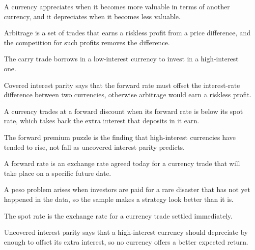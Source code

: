 \begin{keyterms}
\footnotesize
\begin{description}[leftmargin=0pt, itemsep=0pt, parsep=0pt, topsep=0pt, font=\normalfont\bfseries\color{FEMaroon}]
  \item[Appreciation.] A currency appreciates when it becomes more valuable in terms of another currency, and it depreciates when it becomes less valuable.
  \item[Arbitrage.] Arbitrage is a set of trades that earns a riskless profit from a price difference, and the competition for such profits removes the difference.
  \item[Carry trade.] The carry trade borrows in a low-interest currency to invest in a high-interest one.
  \item[Covered interest parity.] Covered interest parity says that the forward rate must offset the interest-rate difference between two currencies, otherwise arbitrage would earn a riskless profit.
  \item[Forward discount.] A currency trades at a forward discount when its forward rate is below its spot rate, which takes back the extra interest that deposits in it earn.
  \item[Forward premium puzzle.] The forward premium puzzle is the finding that high-interest currencies have tended to rise, not fall as uncovered interest parity predicts.
  \item[Forward rate.] A forward rate is an exchange rate agreed today for a currency trade that will take place on a specific future date.
  \item[Peso problem.] A peso problem arises when investors are paid for a rare disaster that has not yet happened in the data, so the sample makes a strategy look better than it is.
  \item[Spot rate.] The spot rate is the exchange rate for a currency trade settled immediately.
  \item[Uncovered interest parity.] Uncovered interest parity says that a high-interest currency should depreciate by enough to offset its extra interest, so no currency offers a better expected return.
\end{description}
\end{keyterms}
